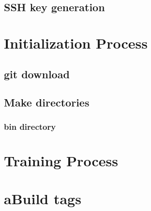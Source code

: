 \documentclass{article}
\begin{document}
\subsection{SSH key generation}
                        
\section{Initialization Process}
\subsection{git download}
\subsection{Make directories}
\subsubsection{bin directory}
\section{Training Process}                      

\section{aBuild tags} %
\end{document}

